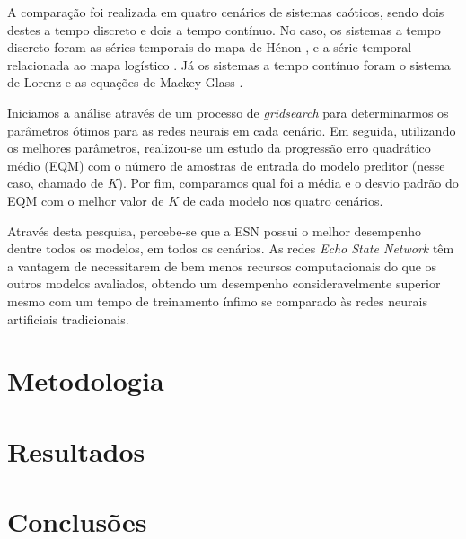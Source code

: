 \documentclass[10pt, technote]{article}
\begin{document}
A comparação foi realizada em quatro cenários de sistemas caóticos, sendo dois destes a tempo discreto e dois a tempo contínuo. No caso, os sistemas a tempo discreto foram as séries temporais do mapa de Hénon \cite{henon1976two}, e a série temporal relacionada ao mapa logístico \cite{may1976simple}. Já os sistemas a tempo contínuo foram o sistema de Lorenz \cite{lorenz1963deterministic} e as equações de Mackey-Glass \cite{mackey1977oscillation}.

Iniciamos a análise através de um processo de \textit{gridsearch} para determinarmos os parâmetros ótimos para as redes neurais em cada cenário. Em seguida, utilizando os melhores parâmetros, realizou-se um estudo da progressão erro quadrático médio (EQM) com o número de amostras de entrada do modelo preditor (nesse caso, chamado de $K$). Por fim, comparamos qual foi a média e o desvio padrão do EQM com o melhor valor de $K$ de cada modelo nos quatro cenários.

Através desta pesquisa, percebe-se que a ESN possui o melhor desempenho dentre todos os modelos, em todos os cenários. As redes \textit{Echo State Network} têm a vantagem de necessitarem de bem menos recursos computacionais do que os outros modelos avaliados, obtendo um desempenho consideravelmente superior mesmo com um tempo de treinamento ínfimo se comparado às redes neurais artificiais tradicionais.

\section{Metodologia}

\section{Resultados}

\section{Conclusões}




\end{document}
